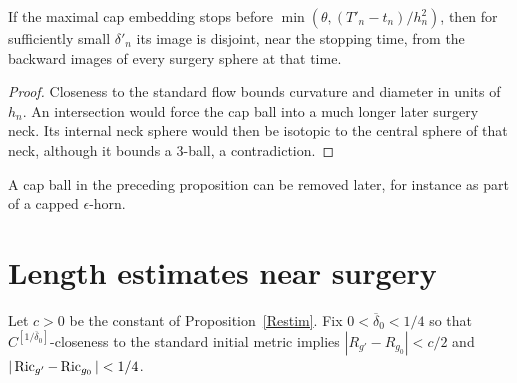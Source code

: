 \begin{claim}
\label{claim:ball-disjoint-from-surgery-spheres}
If the maximal cap embedding stops before $\min(\theta,(T'_n-t_n)/h_n^2)$, then for sufficiently small $\delta'_n$ its image is disjoint, near the stopping time, from the backward images of every surgery sphere at that time.
\end{claim}
\begin{proof}
\sketch
{}
Closeness to the standard flow bounds curvature and diameter in units of $h_n$. An intersection would force the cap ball into a much longer later surgery neck. Its internal neck sphere would then be isotopic to the central sphere of that neck, although it bounds a $3$-ball, a contradiction.
\end{proof}

\begin{remark}
\label{rem:ball-removed-by-later-surgery}

A cap ball in the preceding proposition can be removed later, for instance as part of a capped $\epsilon$-horn.
\end{remark}

\section{Length estimates near surgery}

\begin{definition}
\label{def:overline-delta-0}\label{defnoverlinedelta0}

Let $c>0$ be the constant of Proposition~\ref{Restim}. Fix $0<\overline\delta_0<1/4$ so that $C^{[1/\overline\delta_0]}$-closeness to the standard initial metric implies $|R_{g'}-R_{g_0}|<c/2$ and $|\operatorname{Ric}_{g'}-\operatorname{Ric}_{g_0}|<1/4$.
\end{definition}

